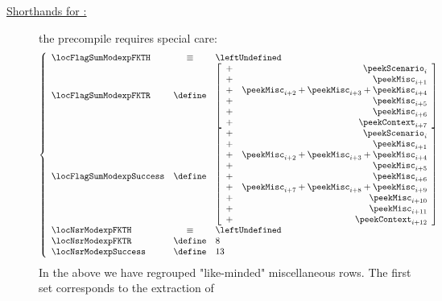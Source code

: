 \begin{description}
	\item[\underline{\underline{Shorthands for :}}] the  precompile requires special care:
		\[
			\left\{ \begin{array}{lcl}
				\locFlagSumModexpFKTH & \equiv  & \leftUndefined \\
				\locFlagSumModexpFKTR & \define &
				\left[ \begin{array}{cr}
					+ & \peekScenario _{i     } \\
					+ & \peekMisc     _{i +  1} \\
					+ & \peekMisc     _{i +  2} 
					+   \peekMisc     _{i +  3} 
					+   \peekMisc     _{i +  4} \\
					+ & \peekMisc     _{i +  5} \\
					+ & \peekMisc     _{i +  6} \\
					+ & \peekContext  _{i +  7} \\
				\end{array} \right] \\
				\locFlagSumModexpSuccess & \define &
				\left[ \begin{array}{cr}
					+ & \peekScenario _{i     } \\
					+ & \peekMisc     _{i +  1} \\
					+ & \peekMisc     _{i +  2} 
					+   \peekMisc     _{i +  3} 
					+   \peekMisc     _{i +  4} \\
					+ & \peekMisc     _{i +  5} \\
					+ & \peekMisc     _{i +  6} \\
					+ & \peekMisc     _{i +  7} 
					+   \peekMisc     _{i +  8} 
					+   \peekMisc     _{i +  9} \\
					+ & \peekMisc     _{i + 10} \\
					+ & \peekMisc     _{i + 11} \\
					+ & \peekContext  _{i + 12} \\
				\end{array} \right] \\
				\locNsrModexpFKTH    & \equiv  & \leftUndefined \\
				\locNsrModexpFKTR    & \define & 8              \\
				\locNsrModexpSuccess & \define & 13             \\
			\end{array} \right.
		\]
		In the above we have regrouped "like-minded" miscellaneous rows.
		The first set corresponds to the extraction of

\end{description}

